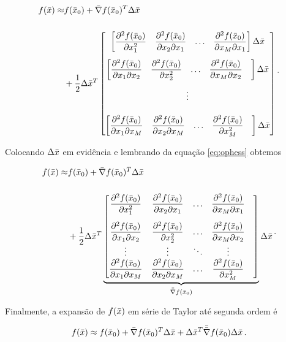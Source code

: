 \begin{equation}
\begin{split}
f(\bar{x}) \approx
&f(\bar{x}_0) + \bar{\nabla}f(\bar{x}_0)^T\Delta\bar{x}\
\\[0.5cm]
&+ \dfrac{1}{2}\Delta\bar{x}^T
\begin{bmatrix}
    \begin{bmatrix}
    \dfrac{\partial^2 f(\bar{x}_0)}{\partial x_1^2} &
    \dfrac{\partial^2 f(\bar{x}_0)}{\partial x_2\partial x_1} &
    \ldots &
    \dfrac{\partial^2 f(\bar{x}_0)}{\partial x_M\partial x_1}
    \end{bmatrix}
    \Delta\bar{x}
    \\[0.5cm]
    \begin{bmatrix}
    \dfrac{\partial^2 f(\bar{x}_0)}{\partial x_1\partial x_2} &
    \dfrac{\partial^2 f(\bar{x}_0)}{\partial x_2^2} &
    \ldots &
    \dfrac{\partial^2 f(\bar{x}_0)}{\partial x_M\partial x_2} &
    \end{bmatrix}
    \Delta\bar{x}
    \\[0.5cm]
    \vdots
    \\[0.5cm]
    \begin{bmatrix}
    \dfrac{\partial^2 f(\bar{x}_0)}{\partial x_1\partial x_M} &
    \dfrac{\partial^2 f(\bar{x}_0)}{\partial x_2\partial x_M} &
    \ldots &
    \dfrac{\partial^2 f(\bar{x}_0)}{\partial x_M^2} &
    \end{bmatrix}
    \Delta\bar{x}
\end{bmatrix}
\end{split}
\thinspace .
\end{equation}

\noindent Colocando $\Delta\bar{x}$ em evidência e lembrando da equação
\ref{eq:ophess} obtemos

\begin{equation}
\begin{split}
f(\bar{x}) \approx
&f(\bar{x}_0) + \bar{\nabla}f(\bar{x}_0)^T\Delta\bar{x}\
\\[0.5cm]
&+ \dfrac{1}{2}\Delta\bar{x}^T
\underbrace{
\begin{bmatrix}
    \dfrac{\partial^2 f(\bar{x}_0)}{\partial x_1^2} &
    \dfrac{\partial^2 f(\bar{x}_0)}{\partial x_2\partial x_1} &
    \ldots &
    \dfrac{\partial^2 f(\bar{x}_0)}{\partial x_M\partial x_1}
    \\[0.5cm]
    \dfrac{\partial^2 f(\bar{x}_0)}{\partial x_1\partial x_2} &
    \dfrac{\partial^2 f(\bar{x}_0)}{\partial x_2^2} &
    \ldots &
    \dfrac{\partial^2 f(\bar{x}_0)}{\partial x_M\partial x_2} &
    \\
    \vdots & \vdots & \ddots & \vdots
    \\
    \dfrac{\partial^2 f(\bar{x}_0)}{\partial x_1\partial x_M} &
    \dfrac{\partial^2 f(\bar{x}_0)}{\partial x_2\partial x_M} &
    \ldots &
    \dfrac{\partial^2 f(\bar{x}_0)}{\partial x_M^2} &
\end{bmatrix}}_{\bar{\bar{\nabla}}f(\bar{x}_0)}
\Delta\bar{x}
\end{split}
\thinspace .
\end{equation}

\noindent Finalmente, a expansão de $f(\bar{x})$ em série de Taylor até
segunda ordem é

\begin{equation}
f(\bar{x}) \approx
    f(\bar{x}_0) +
    \bar{\nabla}f(\bar{x}_0)^T\Delta\bar{x} +
    \Delta\bar{x}^T\bar{\bar{\nabla}}f(\bar{x}_0)\Delta\bar{x}
\thinspace .
\end{equation}
